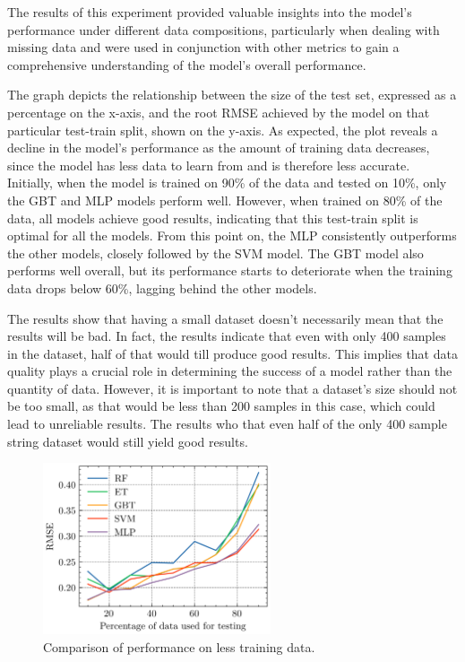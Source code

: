 The results of this experiment provided valuable insights into the model's performance under
different data compositions, particularly when dealing with missing
data and were used in conjunction with other metrics to gain a comprehensive understanding of
the model's overall performance.


The graph depicts the relationship between the size of the test set, expressed as a percentage on the x-axis, and the
root RMSE achieved by the model on that particular test-train split, shown on the y-axis.
As expected, the plot reveals a decline in the model's performance as the amount of training data decreases, since the
model has less data to learn from and is therefore less accurate.
Initially, when the model is trained on 90\% of the data and tested on 10\%, only the GBT and MLP models perform well.
However, when trained on 80\% of the data, all models achieve good results, indicating that this test-train split is
optimal for all the models.
From this point on, the MLP consistently outperforms the other models, closely followed by the SVM model. The GBT
model also performs well overall, but its performance starts to deteriorate when the training data drops below 60\%,
lagging behind the other models.

The results show that having a small dataset doesn't necessarily mean that the results will be bad.
In fact, the results indicate that even with only 400 samples in the dataset, half of that would till produce good
results.
This implies that data quality plays a crucial role in determining the success of a model rather than the quantity of
data.
However, it is important to note that a dataset's size should not be too small, as that would be less than 200
samples in this case, which could lead to unreliable results.
The results who that even half of the only 400 sample string dataset would still yield good results.

\begin{figure}[h]
    \begin{tcolorbox}[arc=0pt,boxrule=0.5pt]
        \centering
        \includegraphics[width=0.6\textwidth]{chap5/images/missing_values_plot}
    \end{tcolorbox}
    \caption{Comparison of performance on less training data.}
    \label{fig:results-missing-values}
\end{figure}

